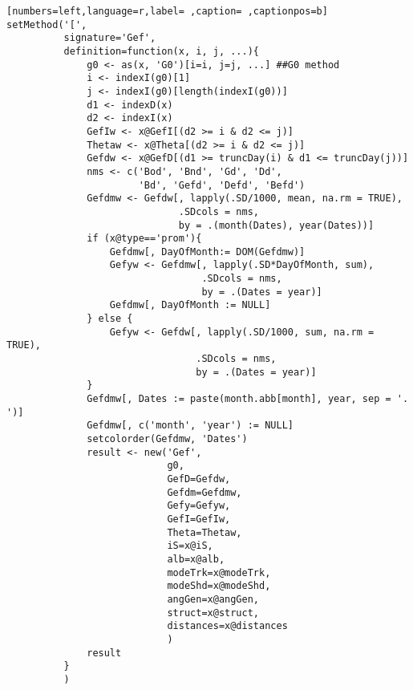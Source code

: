 \begin{lstlisting}[numbers=left,language=r,label= ,caption= ,captionpos=b]
setMethod('[',
          signature='Gef',
          definition=function(x, i, j, ...){
              g0 <- as(x, 'G0')[i=i, j=j, ...] ##G0 method
              i <- indexI(g0)[1]
              j <- indexI(g0)[length(indexI(g0))]
              d1 <- indexD(x)
              d2 <- indexI(x)
              GefIw <- x@GefI[(d2 >= i & d2 <= j)]
              Thetaw <- x@Theta[(d2 >= i & d2 <= j)]
              Gefdw <- x@GefD[(d1 >= truncDay(i) & d1 <= truncDay(j))]
              nms <- c('Bod', 'Bnd', 'Gd', 'Dd',
                       'Bd', 'Gefd', 'Defd', 'Befd')
              Gefdmw <- Gefdw[, lapply(.SD/1000, mean, na.rm = TRUE),
                              .SDcols = nms,
                              by = .(month(Dates), year(Dates))]
              if (x@type=='prom'){
                  Gefdmw[, DayOfMonth:= DOM(Gefdmw)]
                  Gefyw <- Gefdmw[, lapply(.SD*DayOfMonth, sum),
                                  .SDcols = nms,
                                  by = .(Dates = year)]
                  Gefdmw[, DayOfMonth := NULL]
              } else {
                  Gefyw <- Gefdw[, lapply(.SD/1000, sum, na.rm = TRUE),
                                 .SDcols = nms,
                                 by = .(Dates = year)]
              }
              Gefdmw[, Dates := paste(month.abb[month], year, sep = '. ')]
              Gefdmw[, c('month', 'year') := NULL]
              setcolorder(Gefdmw, 'Dates')
              result <- new('Gef',
                            g0,
                            GefD=Gefdw,
                            Gefdm=Gefdmw,
                            Gefy=Gefyw,
                            GefI=GefIw,
                            Theta=Thetaw,
                            iS=x@iS,
                            alb=x@alb,
                            modeTrk=x@modeTrk,
                            modeShd=x@modeShd,
                            angGen=x@angGen,
                            struct=x@struct,
                            distances=x@distances
                            )
              result
          }
          )



\end{lstlisting}
